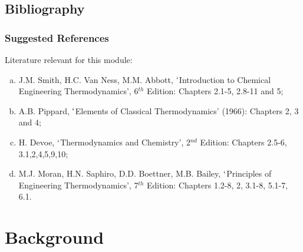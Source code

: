 \documentclass[10pt,compress]{beamer}
\begin{document}
\subsection{Bibliography} 

\begin{frame}
 \frametitle{Suggested References}
  Literature relevant for this module:
  \begin{enumerate}[(a)]
   \item J.M. Smith, H.C. Van Ness, M.M. Abbott, $\lq$Introduction to Chemical Engineering Thermodynamics', 6$^{th}$ Edition: Chapters 2.1-5, 2.8-11 and 5;
   \item A.B. Pippard, $\lq$Elements of Classical Thermodynamics' (1966): Chapters 2, 3 and 4;
   \item H. Devoe, $\lq$Thermodynamics and Chemistry', 2$^{nd}$ Edition: Chapters 2.5-6, 3.1,2,4,5,9,10;
   \item M.J. Moran, H.N. Saphiro, D.D. Boettner, M.B. Bailey, $\lq$Principles of Engineering Thermodynamics', 7$^{th}$ Edition: Chapters 1.2-8, 2, 3.1-8, 5.1-7, 6.1.
  \end{enumerate}
\end{frame}

\section{Background} 
\end{document}
